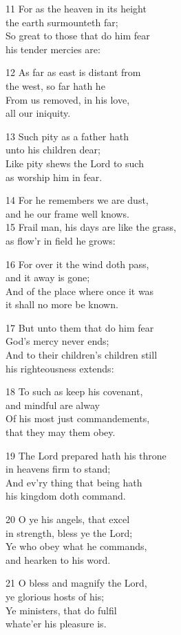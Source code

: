 11 For as the heaven in its height\\
the earth surmounteth far;\\
So great to those that do him fear\\
his tender mercies are:

12 As far as east is distant from\\
the west, so far hath he\\
From us removed, in his love,\\
all our iniquity.

13 Such pity as a father hath\\
unto his children dear;\\
Like pity shews the Lord to such\\
as worship him in fear.

14 For he remembers we are dust,\\
and he our frame well knows.\\
15 Frail man, his days are like the grass,\\
as flow’r in field he grows:

16 For over it the wind doth pass,\\
and it away is gone;\\
And of the place where once it was\\
it shall no more be known.

17 But unto them that do him fear\\
God’s mercy never ends;\\
And to their children’s children still\\
his righteousness extends:

18 To such as keep his covenant,\\
and mindful are alway\\
Of his most just commandements,\\
that they may them obey.

19 The Lord prepared hath his throne\\
in heavens firm to stand;\\
And ev’ry thing that being hath\\
his kingdom doth command.

20 O ye his angels, that excel\\
in strength, bless ye the Lord;\\
Ye who obey what he commands,\\
and hearken to his word.

21 O bless and magnify the Lord,\\
ye glorious hosts of his;\\
Ye ministers, that do fulfil\\
whate’er his pleasure is.

